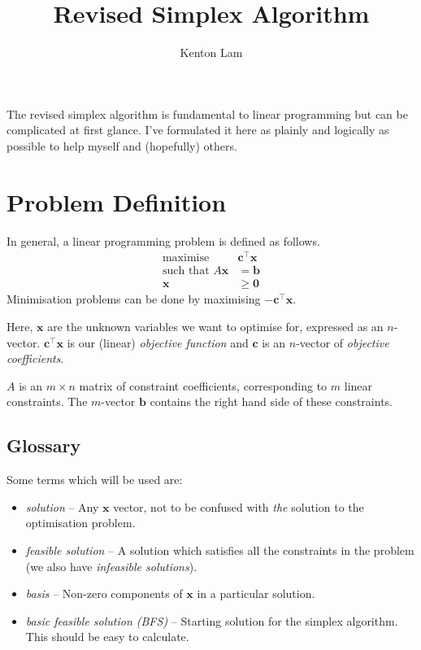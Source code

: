 \documentclass[12pt,a4paper]{article} %
\title{Revised Simplex Algorithm}
\author{Kenton Lam}
\begin{document}
\maketitle

The revised simplex algorithm is fundamental to 
linear programming but can be complicated at first glance.
I've formulated it here as plainly and logically as possible 
to help myself and (hopefully) others.


\section{Problem Definition}
In general, a linear programming problem is defined as follows. 
\begin{align*}
    \text{maximise }&\bm c^\top \bm x \\ 
    \text{such that } A\bm x &= \bm b \\ 
    \bm x &\ge \bm 0
\end{align*}
Minimisation problems can be done by maximising $-\bm c^\top \bm x$.

Here, $\bm x$ are the unknown variables we want to optimise for, 
expressed as an $n$-vector. 
$\bm c^\top \bm x$ is our (linear) \textit{objective function} and $\bm c$ 
is an $n$-vector of \textit{objective coefficients}.

$A$ is an $m\times n$ matrix of constraint coefficients, 
corresponding to $m$ linear constraints. The $m$-vector $\bm b$ 
contains the right hand side of these constraints.

\subsection{Glossary}
Some terms which will be used are:
\begin{itemize}
    \item \textit{solution} -- Any $\bm x$ vector, not to be confused with \textit{the} solution to the optimisation problem.
    \item \textit{feasible solution} -- A solution which satisfies all the constraints in the problem (we also have \textit{infeasible solutions}).
    \item \textit{basis} -- Non-zero components of $\bm x$ in a particular solution.
    \item \textit{basic feasible solution (BFS)} -- Starting solution for the simplex algorithm.
    This should be easy to calculate. 
\end{itemize}
\end{document}
